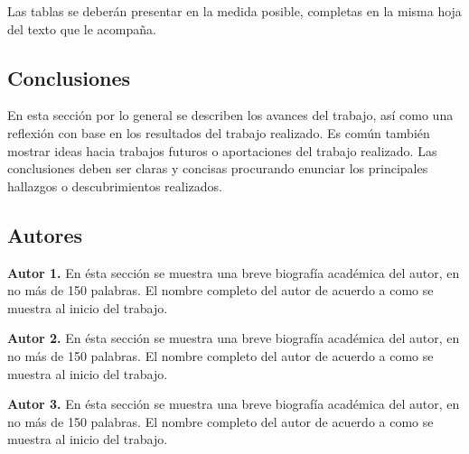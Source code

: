 \documentclass[10pt]{article}
\begin{document}
        Las tablas se deberán presentar en la medida posible, completas en la misma hoja del texto que le acompaña.



\begin{center}
    \section{Conclusiones}
\end{center}

        En esta sección por lo general se describen los avances del trabajo, así como una reflexión con base en los resultados del trabajo realizado. Es común también mostrar ideas hacia trabajos futuros o aportaciones del trabajo realizado. Las conclusiones deben ser claras y concisas procurando enunciar los principales hallazgos o descubrimientos realizados.



\vspace{0.5cm}
\nocite{*}



\begin{center}
    \section*{Autores}
\end{center}

    \textbf{Autor 1.} En ésta sección se muestra una breve biografía académica del autor, en no más de 150 palabras. El nombre completo del autor de acuerdo a como se muestra al inicio del trabajo.

    \textbf{Autor 2.} En ésta sección se muestra una breve biografía académica del autor, en no más de 150 palabras. El nombre completo del autor de acuerdo a como se muestra al inicio del trabajo.

    \textbf{Autor 3.} En ésta sección se muestra una breve biografía académica del autor, en no más de 150 palabras. El nombre completo del autor de acuerdo a como se muestra al inicio del trabajo.
    
\end{document}
